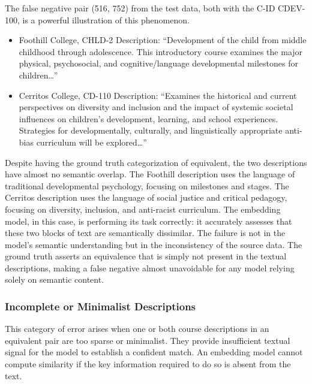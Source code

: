 The false negative pair (516, 752) from the test data, both with the C-ID CDEV-100, is a powerful illustration of this phenomenon.
\begin{itemize}
    \item Foothill College, CHLD-2 Description: ``Development of the child from middle childhood through adolescence. This introductory course examines the major physical, psychosocial, and cognitive/language developmental milestones for children\dots''
    \item Cerritos College, CD-110 Description: ``Examines the historical and current perspectives on diversity and inclusion and the impact of systemic societal influences on children's development, learning, and school experiences. Strategies for developmentally, culturally, and linguistically appropriate anti-bias curriculum will be explored\dots''
\end{itemize}

Despite having the ground truth categorization of equivalent, the two descriptions have almost no semantic overlap. The Foothill description uses the language of traditional developmental psychology, focusing on milestones and stages. The Cerritos description uses the language of social justice and critical pedagogy, focusing on diversity, inclusion, and anti-racist curriculum. The embedding model, in this case, is performing its task correctly: it accurately assesses that these two blocks of text are semantically dissimilar. The failure is not in the model's semantic understanding but in the inconsistency of the source data. The ground truth asserts an equivalence that is simply not present in the textual descriptions, making a false negative almost unavoidable for any model relying solely on semantic content.

\subsubsection{Incomplete or Minimalist Descriptions}
This category of error arises when one or both course descriptions in an equivalent pair are too sparse or minimalist. They provide insufficient textual signal for the model to establish a confident match. An embedding model cannot compute similarity if the key information required to do so is absent from the text.  

